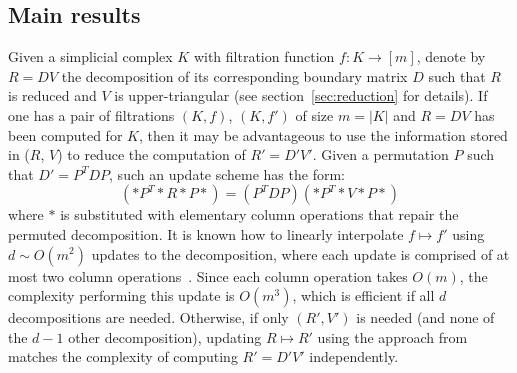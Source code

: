 \documentclass[sn-mathphys]{sn-jnl}
\begin{document}
\subsection{Main results}
Given a simplicial complex $K$ with filtration function $f : K \to [m]$, denote by $R = D V$ the decomposition of its corresponding boundary matrix $D$ such that $R$ is reduced and $V$ is upper-triangular (see section~\ref{sec:reduction} for details).
 If one has a pair of filtrations $(K, f)$,  $(K, f')$ of size $m = \lvert K \rvert$ and $R = D V$ has been computed for $K$, then it may be advantageous to use the information stored in ($R$, $V$) to reduce the computation of $R' = D' V'$. 
Given a permutation $P$ such that $D' = P^T D P$, such an update scheme has the form: 
$$ (\ast P^T \ast R \ast P \ast) = (P^T DP)(\ast P^T \ast V \ast P \ast) $$
where $\ast$ is substituted with elementary column operations that repair the permuted decomposition. It is known how to linearly interpolate $f \mapsto f'$ using $d \sim O(m^2)$ updates to the decomposition, where each update is comprised of at most two column operations~\cite{cohen2006vines}. Since each column operation takes $O(m)$, the complexity performing this update is $O(m^3)$, which is efficient if all $d$ decompositions are needed. Otherwise, if only $(R', V')$ is needed (and none of the $d -1$ other decomposition), updating $R \mapsto R'$ using the approach from~\cite{cohen2006vines} matches the complexity of computing $R' = D' V'$ independently. 
\end{document}
